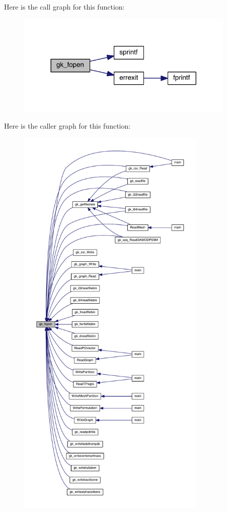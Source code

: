 Here is the call graph for this function\+:\nopagebreak
\begin{figure}[H]
\begin{center}
\leavevmode
\includegraphics[width=296pt]{a00855_abff04948821f625a3e59666e61c70e2f_cgraph}
\end{center}
\end{figure}
Here is the caller graph for this function\+:\nopagebreak
\begin{figure}[H]
\begin{center}
\leavevmode
\includegraphics[height=550pt]{a00855_abff04948821f625a3e59666e61c70e2f_icgraph}
\end{center}
\end{figure}
\mbox{\label{a00855_a825d4634e2e656bc3dc9f3af0c9b1d5d}} 
